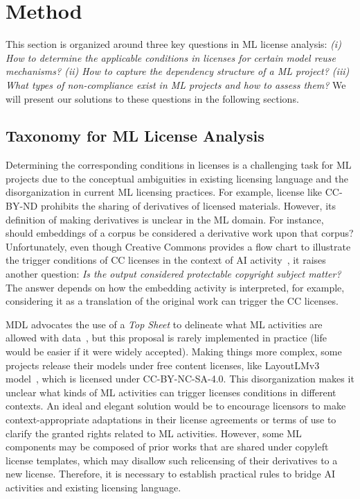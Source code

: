 \section{Method}
\label{sec:method}
This section is organized around three key questions in ML license analysis: \emph{(i) How to determine the applicable conditions in licenses for certain model reuse mechanisms? (ii) How to capture the dependency structure of a ML project? (iii) What types of non-compliance exist in ML projects and how to assess them?}
We will present our solutions to these questions in the following sections.

\subsection{Taxonomy for ML License Analysis}
Determining the corresponding conditions in licenses is a challenging task for ML projects due to the conceptual ambiguities in existing licensing language and the disorganization in current ML licensing practices.
For example, license like CC-BY-ND prohibits the sharing of derivatives of licensed materials.
However, its definition of making derivatives is unclear in the ML domain.
For instance, should embeddings of a corpus be considered a derivative work upon that corpus?
Unfortunately, even though Creative Commons provides a flow chart to illustrate the trigger conditions of CC licenses in the context of AI activity~\cite{creative2023artificial}, it raises another question: \textit{Is the output considered protectable copyright subject matter?}
The answer depends on how the embedding activity is interpreted, for example, considering it as a translation of the original work can trigger the CC licenses.

MDL advocates the use of a \textit{Top Sheet} to delineate what ML activities are allowed with data~\cite{benjamin2019towards}, but this proposal is rarely implemented in practice (life would be easier if it were widely accepted). 
Making things more complex, some projects release their models under free content licenses, like LayoutLMv3 model~\cite{huang2022layoutlmv3}, which is licensed under CC-BY-NC-SA-4.0. 
This disorganization makes it unclear what kinds of ML activities can trigger licenses conditions in different contexts.
An ideal and elegant solution would be to encourage licensors to make context-appropriate adaptations in their license agreements or terms of use to clarify the granted rights related to ML activities. 
However, some ML components may be composed of prior works that are shared under copyleft license templates, which may disallow such relicensing of their derivatives to a new license.
Therefore, it is necessary to establish practical rules to bridge AI activities and existing licensing language.

